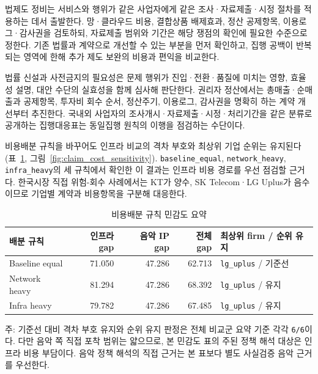 \documentclass[11pt,a4paper]{report}
\begin{document}
법제도 정비는 서비스와 행위가 같은 사업자에게 같은 조사·자료제출·시정 절차를 적용하는 데서 출발한다. 망·클라우드 비용, 결합상품 배제효과, 정산 공제항목, 이용로그·감사권을 검토하되, 자료제출 범위와 기간은 해당 쟁점의 확인에 필요한 수준으로 정한다. 기존 법률과 계약으로 개선할 수 있는 부분을 먼저 확인하고, 집행 공백이 반복되는 영역에 한해 추가 제도 보완의 비용과 편익을 비교한다.

법률 신설과 사전금지의 필요성은 문제 행위가 진입·전환·품질에 미치는 영향, 효율성 설명, 대안 수단의 실효성을 함께 심사해 판단한다. 권리자 정산에서는 총매출·순매출과 공제항목, 투자비 회수 순서, 정산주기, 이용로그, 감사권을 명확히 하는 계약 개선부터 추진한다. 국내외 사업자의 조사개시·자료제출·시정·처리기간을 같은 분류로 공개하는 집행대응표는 동일집행 원칙의 이행을 점검하는 수단이다.

비용배분 규칙을 바꾸어도 인프라 비교의 격차 부호와 최상위 기업 순위는 유지된다(표~\ref{tab:claim_cost_sensitivity}, 그림~\ref{fig:claim_cost_sensitivity}). \texttt{baseline\_equal}, \texttt{network\_heavy}, \texttt{infra\_heavy}의 세 규칙에서 확인한 이 결과는 인프라 비용 경로를 우선 점검할 근거다. 한국시장 직접 위험-회수 사례에서는 KT가 양수, SK Telecom·LG Uplus가 음수이므로 기업별 계약과 비용항목을 구분해 대응한다.

\begin{table}[H]
\centering
\caption{비용배분 규칙 민감도 요약}
\label{tab:claim_cost_sensitivity}
\small
\begin{tabular}{p{2.7cm}rrrl}
\toprule
\rowcolor{ReportTableHead}
배분 규칙 & 인프라 gap & 음악 IP gap & 전체 gap & 최상위 firm / 순위 유지 \\
\midrule
Baseline equal & 71.050 & 47.286 & 62.713 & \texttt{lg\_uplus} / 기준선 \\
Network heavy & 81.294 & 47.286 & 68.392 & \texttt{lg\_uplus} / 유지 \\
Infra heavy & 79.782 & 47.286 & 67.485 & \texttt{lg\_uplus} / 유지 \\
\bottomrule
\end{tabular}

\vspace{0.3em}
{\par\raggedright\footnotesize 주: 기준선 대비 격차 부호 유지와 순위 유지 판정은 전체 비교군 요약 기준 각각 \texttt{6/6}이다. 다만 음악 쪽 직접 포착 범위는 얇으므로, 본 민감도 표의 주된 정책 해석 대상은 인프라 비용 부담이다. 음악 정책 해석의 직접 근거는 본 표보다 별도 사실검증 음악 근거를 우선한다.\par}
\end{table}
\end{document}
